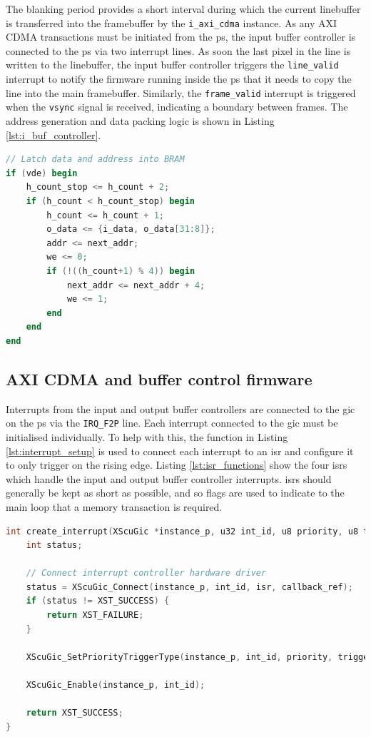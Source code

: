 The blanking period provides a short interval during which the current linebuffer is transferred into the framebuffer by the \texttt{i\_axi\_cdma} instance. As any AXI CDMA transactions must be initiated from the \gls{ps}, the input buffer controller is connected to the \gls{ps} via two interrupt lines. As soon the last pixel in the line is written to the linebuffer, the input buffer controller triggers the \texttt{line\_valid} interrupt to notify the firmware running inside the \gls{ps} that it needs to copy the line into the main framebuffer. Similarly, the \texttt{frame\_valid} interrupt is triggered when the \texttt{vsync} signal is received, indicating a boundary between frames. The address generation and data packing logic is shown in Listing \ref{lst:i_buf_controller}.

\begin{lstlisting}[caption={Address generation and data packing logic for input framebuffer.}, label={lst:i_buf_controller}, language=Verilog]
// Latch data and address into BRAM
if (vde) begin
    h_count_stop <= h_count + 2;
    if (h_count < h_count_stop) begin
        h_count <= h_count + 1;
        o_data <= {i_data, o_data[31:8]};
        addr <= next_addr;
        we <= 0;
        if (!((h_count+1) % 4)) begin
            next_addr <= next_addr + 4;
            we <= 1;
        end
    end
end
\end{lstlisting}

\subsection{AXI CDMA and buffer control firmware}
Interrupts from the input and output buffer controllers are connected to the \gls{gic} on the \gls{ps} via the \texttt{IRQ\_F2P} line. Each interrupt connected to the \gls{gic} must be initialised individually. To help with this, the function in Listing \ref{lst:interrupt_setup} is used to connect each interrupt to an \gls{isr} and configure it to only trigger on the rising edge. Listing \ref{lst:isr_functions} show the four \glspl{isr} which handle the input and output buffer controller interrupts. \glspl{isr} should generally be kept as short as possible, and so flags are used to indicate to the main loop that a memory transaction is required.

\begin{lstlisting}[caption={Interrupt setup function}, label={lst:interrupt_setup}, language=C]
int create_interrupt(XScuGic *instance_p, u32 int_id, u8 priority, u8 trigger, Xil_InterruptHandler isr, void *callback_ref) {
    int status;

    // Connect interrupt controller hardware driver
    status = XScuGic_Connect(instance_p, int_id, isr, callback_ref);
    if (status != XST_SUCCESS) {
        return XST_FAILURE;
    }

    XScuGic_SetPriorityTriggerType(instance_p, int_id, priority, trigger);

    XScuGic_Enable(instance_p, int_id);

    return XST_SUCCESS;
}
\end{lstlisting}

